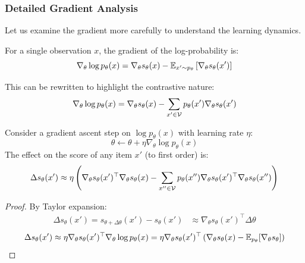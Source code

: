 \begin{notechapter}
\subsubsection{Detailed Gradient Analysis}

Let us examine the gradient more carefully to understand the learning dynamics.

\begin{proposition}
For a single observation $x$, the gradient of the log-probability is:
\begin{equation}
\nabla_\theta \log p_\theta(x) = \nabla_\theta s_\theta(x) - \mathbb{E}_{x' \sim p_\theta}\left[\nabla_\theta s_\theta(x')\right]
\end{equation}
\end{proposition}

This can be rewritten to highlight the contrastive nature:
\begin{equation}
\nabla_\theta \log p_\theta(x) = \nabla_\theta s_\theta(x) - \sum_{x' \in \mathcal{V}} p_\theta(x') \nabla_\theta s_\theta(x')
\end{equation}

\begin{proposition}
\label{contrastive-rigorous:prop:score_dynamics}
Consider a gradient ascent step on $\log p_\theta(x)$ with learning rate $\eta$:
\begin{equation}
\theta \leftarrow \theta + \eta \nabla_\theta \log p_\theta(x) \label{contrastive-rigorous:eq:step}
\end{equation}
The effect on the score of any item $x'$ (to first order) is:
\begin{equation}
\Delta s_\theta(x') \approx \eta \left(\nabla_\theta s_\theta(x')^\top \nabla_\theta s_\theta(x) - \sum_{x'' \in \mathcal{V}} p_\theta(x'') \nabla_\theta s_\theta(x')^\top \nabla_\theta s_\theta(x'')\right)
\end{equation}
\end{proposition}

\begin{proof}
By Taylor expansion:
\begin{align*}
\Delta s_\theta(x') = s_{\theta + \Delta\theta}(x') - s_\theta(x')
&\approx \nabla_\theta s_\theta(x')^\top \Delta\theta
\end{align*}
\begin{align*}
\Delta s_\theta(x') \approx \eta \nabla_\theta s_\theta(x')^\top \nabla_\theta \log p_\theta(x) 
= \eta \nabla_\theta s_\theta(x')^\top \left(\nabla_\theta s_\theta(x) - \mathbb{E}_{p_\theta}[\nabla_\theta s_\theta]\right)
\end{align*}
\end{proof}


\end{notechapter}
